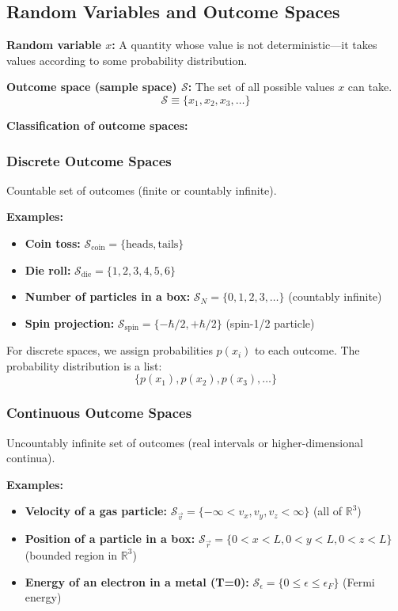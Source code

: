 \documentclass[9pt,twocoloumn]{article}
\begin{document}
\subsection{Random Variables and Outcome Spaces}

\textbf{Random variable $x$:} A quantity whose value is not deterministic—it takes values according to some probability distribution.

\textbf{Outcome space (sample space) $\mathcal{S}$:} The set of all possible values $x$ can take.
\begin{equation}
\mathcal{S} \equiv \{x_1, x_2, x_3, \ldots\}
\end{equation}

\textbf{Classification of outcome spaces:}

\subsubsection{Discrete Outcome Spaces}

Countable set of outcomes (finite or countably infinite).

\textbf{Examples:}
\begin{itemize}
    \item \textbf{Coin toss:} $\mathcal{S}_{\text{coin}} = \{\text{heads}, \text{tails}\}$
    \item \textbf{Die roll:} $\mathcal{S}_{\text{die}} = \{1, 2, 3, 4, 5, 6\}$
    \item \textbf{Number of particles in a box:} $\mathcal{S}_N = \{0, 1, 2, 3, \ldots\}$ (countably infinite)
    \item \textbf{Spin projection:} $\mathcal{S}_{\text{spin}} = \{-\hbar/2, +\hbar/2\}$ (spin-1/2 particle)
\end{itemize}

For discrete spaces, we assign probabilities $p(x_i)$ to each outcome. The probability distribution is a list:
\begin{equation}
\{p(x_1), p(x_2), p(x_3), \ldots\}
\end{equation}

\subsubsection{Continuous Outcome Spaces}

Uncountably infinite set of outcomes (real intervals or higher-dimensional continua).

\textbf{Examples:}
\begin{itemize}
    \item \textbf{Velocity of a gas particle:} $\mathcal{S}_{\vec{v}} = \{-\infty < v_x, v_y, v_z < \infty\}$ (all of $\mathbb{R}^3$)
    \item \textbf{Position of a particle in a box:} $\mathcal{S}_{\vec{r}} = \{0 < x < L, 0 < y < L, 0 < z < L\}$ (bounded region in $\mathbb{R}^3$)
    \item \textbf{Energy of an electron in a metal (T=0):} $\mathcal{S}_\epsilon = \{0 \leq \epsilon \leq \epsilon_F\}$ (Fermi energy)
\end{itemize}
\end{document}
